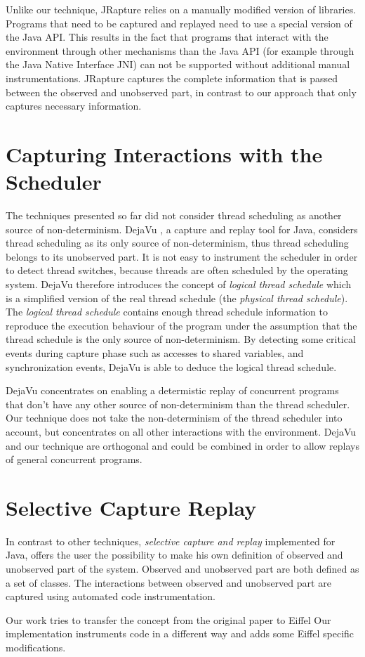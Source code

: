 Unlike our technique, JRapture relies on a manually modified version of libraries. Programs that need to be captured and replayed need to use a special version of the Java API.  This results in the fact that programs that interact with the environment through other mechanisms than the Java API (for example through the Java Native Interface JNI) can not be supported without additional manual instrumentations. JRapture captures the complete information that is passed between the observed and unobserved part, in contrast to our approach that only captures necessary information.

\section {Capturing Interactions with the Scheduler}
The techniques presented so far did not consider thread scheduling as another source of non-determinism. DejaVu \cite{dejavu}, a capture and replay tool for Java, considers thread scheduling as its only source of non-determinism, thus thread scheduling belongs to its unobserved part. It is not easy to instrument the scheduler in order to detect thread switches, because threads are often scheduled by the operating system. DejaVu therefore introduces the concept of \emph{logical thread schedule} which is a simplified version of the real thread schedule (the \emph{physical thread schedule}). The \emph{logical thread schedule} contains enough thread schedule information to reproduce the execution behaviour of the program under the assumption that the thread schedule is the only source of non-determinism. By detecting some critical events during capture phase such as accesses to shared variables, and synchronization events, DejaVu is able to deduce the logical thread schedule.

DejaVu concentrates on enabling a determistic replay of concurrent programs that don't have any other source of non-determinism than the thread scheduler. Our technique does not take the non-determinism of the thread scheduler into account, but concentrates on all other interactions with the environment. DejaVu and our technique are orthogonal and could be combined in order to allow replays of general concurrent programs. 

\section{Selective Capture Replay}
In contrast to other techniques, \emph{selective capture and replay} \cite{orso05may} implemented for Java, offers the user the possibility to make his own definition of observed and unobserved part of the system. Observed and unobserved part are both defined as a set of classes. The interactions between observed and unobserved part are captured using automated code instrumentation.

Our work tries to transfer the concept from the original paper \cite{orso05may} to Eiffel Our implementation instruments code in a different way and adds some Eiffel specific modifications.
